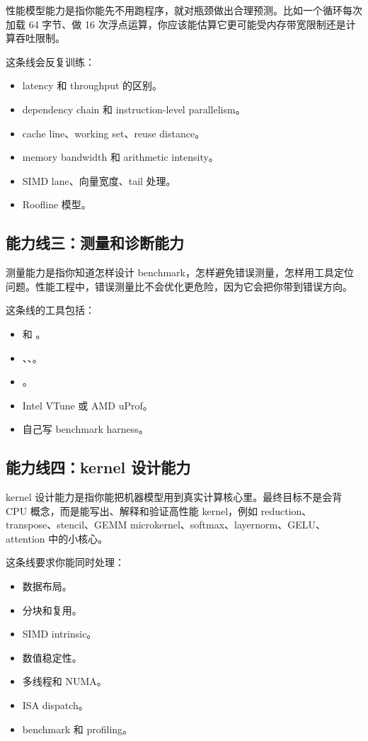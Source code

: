性能模型能力是指你能先不用跑程序，就对瓶颈做出合理预测。比如一个循环每次加载 64 字节、做 16 次浮点运算，你应该能估算它更可能受内存带宽限制还是计算吞吐限制。

这条线会反复训练：

\begin{itemize}
  \item latency 和 throughput 的区别。
  \item dependency chain 和 instruction-level parallelism。
  \item cache line、working set、reuse distance。
  \item memory bandwidth 和 arithmetic intensity。
  \item SIMD lane、向量宽度、tail 处理。
  \item Roofline 模型。
\end{itemize}

\subsection{能力线三：测量和诊断能力}

测量能力是指你知道怎样设计 benchmark，怎样避免错误测量，怎样用工具定位问题。性能工程中，错误测量比不会优化更危险，因为它会把你带到错误方向。

这条线的工具包括：

\begin{itemize}
  \item {} 和 。
  \item {}、、。
  \item {}。
  \item Intel VTune 或 AMD uProf。
  \item 自己写 benchmark harness。
\end{itemize}

\subsection{能力线四：kernel 设计能力}

kernel 设计能力是指你能把机器模型用到真实计算核心里。最终目标不是会背 CPU 概念，而是能写出、解释和验证高性能 kernel，例如 reduction、transpose、stencil、GEMM microkernel、softmax、layernorm、GELU、attention 中的小核心。

这条线要求你能同时处理：

\begin{itemize}
  \item 数据布局。
  \item 分块和复用。
  \item SIMD intrinsic。
  \item 数值稳定性。
  \item 多线程和 NUMA。
  \item ISA dispatch。
  \item benchmark 和 profiling。
\end{itemize}

